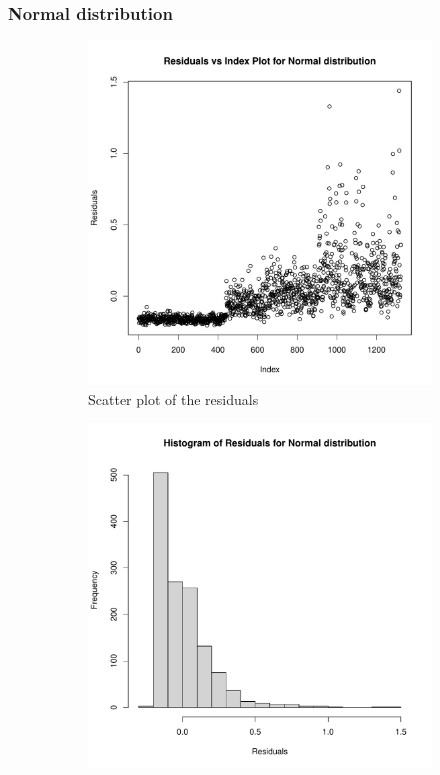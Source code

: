 \documentclass[12pt,a4paper,twoside]{article}
\begin{document}
\subsubsection{Normal distribution}
\label{sssec:gaussian}
\begin{figure}[!ht]
    \begin{subfigure}{.45\textwidth}
        \centering
        \includegraphics[width=\linewidth]{img/normal_residuals.pdf}
        \caption{Scatter plot of the residuals}
        \label{fig:gaussianscatter}
    \end{subfigure}
    \begin{subfigure}{.45\textwidth}
        \centering
        \includegraphics[width=\linewidth]{img/normal_residuals_hist.pdf}

\end{subfigure}
\end{figure}
\end{document}
